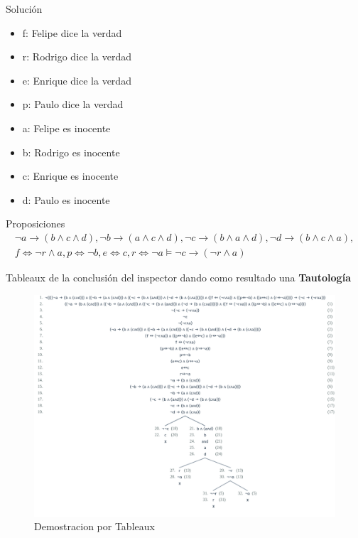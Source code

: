 \documentclass{article}
\begin{document}
\begin{enumerate}
		
		

		Solución \\
		\begin{itemize}
		    \item f: Felipe dice la verdad
		    \item r: Rodrigo dice la verdad
		    \item e: Enrique dice la verdad
		    \item p: Paulo dice la verdad
		    \item a: Felipe es inocente
		    \item b: Rodrigo es inocente
		    \item c: Enrique es inocente
		    \item d: Paulo es inocente
		\end{itemize}
		
		Proposiciones \\
		\begin{equation}
		   \begin{aligned}
             \neg a  \to  ( b \land c \land d), \neg b  \to  ( a \land c \land d), \neg c  \to  ( b \land a \land d), \neg d  \to  ( b \land c \land a), \\f \Leftrightarrow  \neg r \land a,
            p \Leftrightarrow \neg b,e \Leftrightarrow c, r \Leftrightarrow \neg a
         \models \neg c \to (\neg r \land a)
           \end{aligned}
        \end{equation}
		
		Tableaux de la conclusión del inspector dando como resultado una \textbf{Tautología}
		
		\begin{figure}[H]
			\centering
			\includegraphics[scale=0.40]{img/problem2tableaux.png}
			\caption{ Demostracion por Tableaux}
			\label{fig:tableaux}
		\end{figure}


\end{enumerate}
\end{document}
